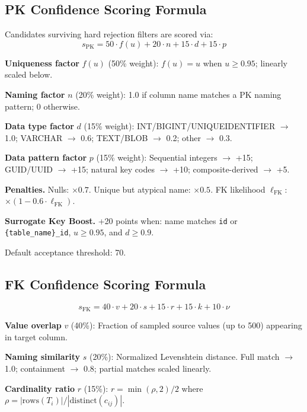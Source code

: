\documentclass[sigconf, nonacm]{acmart}
\begin{document}
\subsection{PK Confidence Scoring Formula}

Candidates surviving hard rejection filters are scored via:
\begin{equation}
s_{\mathrm{PK}} = 50 \cdot f(u) + 20 \cdot n + 15 \cdot d + 15 \cdot p
\end{equation}

\textbf{Uniqueness factor} $f(u)$ (50\% weight): $f(u) = u$ when $u \geq 0.95$; linearly scaled below.

\textbf{Naming factor} $n$ (20\% weight): 1.0 if column name matches a PK naming pattern; 0 otherwise.

\textbf{Data type factor} $d$ (15\% weight): INT/BIGINT/UNIQUEIDENTIFIER $\to$ 1.0; VARCHAR $\to$ 0.6; TEXT/BLOB $\to$ 0.2; other $\to$ 0.3.

\textbf{Data pattern factor} $p$ (15\% weight): Sequential integers $\to$ +15; GUID/UUID $\to$ +15; natural key codes $\to$ +10; composite-derived $\to$ +5.

\textbf{Penalties.} Nulls: $\times 0.7$. Unique but atypical name: $\times 0.5$. FK likelihood $\ell_{\mathrm{FK}}$: $\times (1 - 0.6 \cdot \ell_{\mathrm{FK}})$.

\textbf{Surrogate Key Boost.} +20 points when: name matches \texttt{id} or \texttt{\{table\_name\}\_id}, $u \geq 0.95$, and $d \geq 0.9$.

Default acceptance threshold: 70.

\subsection{FK Confidence Scoring Formula}

\begin{equation}
s_{\mathrm{FK}} = 40 \cdot v + 20 \cdot s + 15 \cdot r + 15 \cdot k + 10 \cdot \nu
\end{equation}

\textbf{Value overlap} $v$ (40\%): Fraction of sampled source values (up to 500) appearing in target column.

\textbf{Naming similarity} $s$ (20\%): Normalized Levenshtein distance. Full match $\to$ 1.0; containment $\to$ 0.8; partial matches scaled linearly.

\textbf{Cardinality ratio} $r$ (15\%): $r = \min(\rho, 2) / 2$ where $\rho = |\mathrm{rows}(T_i)| / |\mathrm{distinct}(c_{ij})|$.
\end{document}
